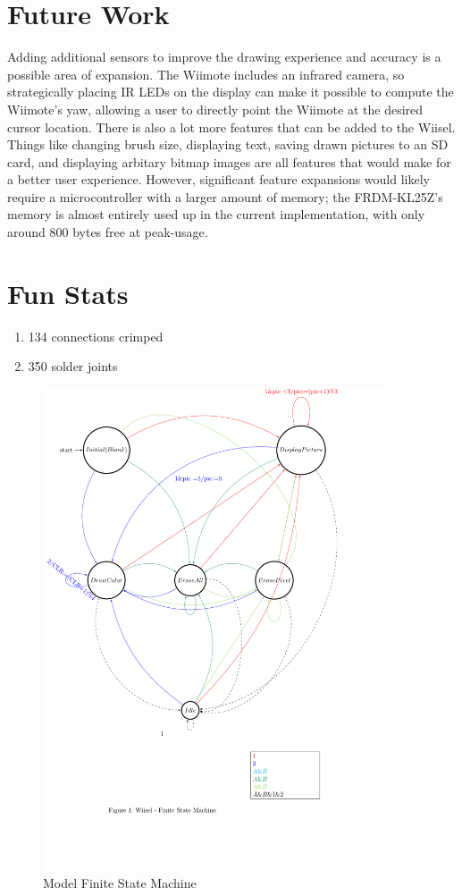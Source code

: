 \documentclass[10pt,twocolumn]{article}
\begin{document}
\section{Future Work}
Adding additional sensors to improve the drawing experience and accuracy is a
possible area of expansion. The Wiimote includes an infrared camera, so
strategically placing IR LEDs on the display can make it possible to compute
the Wiimote's yaw, allowing a user to directly point the Wiimote at the
desired cursor location. There is also a lot more features that can be added
to the Wiisel. Things like changing brush size,
displaying text, saving drawn pictures to an SD card, and displaying arbitary
bitmap images are all features that would make for a better user experience.
However, significant feature expansions would likely require a microcontroller
with a larger amount of memory; the FRDM-KL25Z's memory is almost entirely
used up in the current implementation, with only around 800 bytes free at
peak-usage.

\section{Fun Stats}
\begin{enumerate}
    \item 134 connections crimped
    \item 350 solder joints
\end{enumerate}

\appendix

\begin{figure}
    \includegraphics[width=0.9\textwidth]{fsm2.pdf}
    \caption{Model Finite State Machine}
    \label{fsm}
\end{figure}
\end{document}
